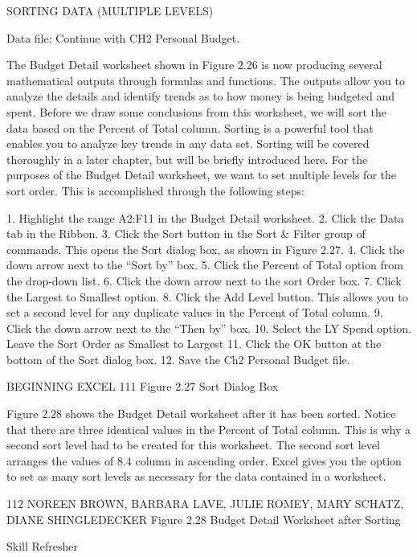 SORTING DATA (MULTIPLE LEVELS)

Data file: Continue with CH2 Personal Budget.

The Budget Detail worksheet shown in Figure 2.26 is now producing several mathematical outputs
through formulas and functions. The outputs allow you to analyze the details and identify trends as
to how money is being budgeted and spent. Before we draw some conclusions from this worksheet,
we will sort the data based on the Percent of Total column. Sorting is a powerful tool that enables you
to analyze key trends in any data set. Sorting will be covered thoroughly in a later chapter, but will
be briefly introduced here. For the purposes of the Budget Detail worksheet, we want to set multiple
levels for the sort order. This is accomplished through the following steps:

1. Highlight the range A2:F11 in the Budget Detail worksheet.
2. Click the Data tab in the Ribbon.
3. Click the Sort button in the Sort \& Filter group of commands. This opens the Sort dialog box, as
shown in Figure 2.27.
4. Click the down arrow next to the “Sort by” box.
5. Click the Percent of Total option from the drop-down list.
6. Click the down arrow next to the sort Order box.
7. Click the Largest to Smallest option.
8. Click the Add Level button. This allows you to set a second level for any duplicate values in the
Percent of Total column.
9. Click the down arrow next to the “Then by” box.
10. Select the LY Spend option. Leave the Sort Order as Smallest to Largest
11. Click the OK button at the bottom of the Sort dialog box.
12. Save the Ch2 Personal Budget file.




BEGINNING EXCEL 111
Figure 2.27 Sort Dialog Box


Figure 2.28 shows the Budget Detail worksheet after it has been sorted. Notice that there are three
identical values in the Percent of Total column. This is why a second sort level had to be created for
this worksheet. The second sort level arranges the values of 8.4%
column in ascending order. Excel gives you the option to set as many sort levels as necessary for the
data contained in a worksheet.




112 NOREEN BROWN, BARBARA LAVE, JULIE ROMEY, MARY SCHATZ, DIANE SHINGLEDECKER
Figure 2.28 Budget Detail Worksheet after Sorting




Skill Refresher


